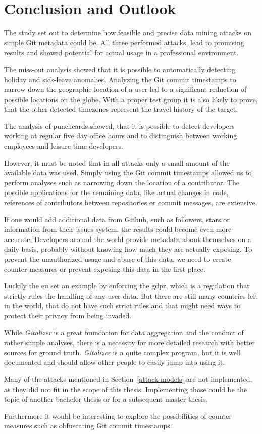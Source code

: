 \chapter{Conclusion and Outlook}

The study set out to determine how feasible and precise data mining attacks on simple Git metadata could be.
All three performed attacks, lead to promising results and showed potential for actual usage in a professional environment.

The miss-out analysis showed that it is possible to automatically detecting holiday and sick-leave anomalies.
Analyzing the Git commit timestamps to narrow down the geographic location of a user led to a significant reduction of possible locations on the globe.
With a proper test group it is also likely to prove, that the other detected timezones represent the travel history of the target.

The analysis of punchcards showed, that it is possible to detect developers working at regular five day office hours and to distinguish between working employees and leisure time developers.

However, it must be noted that in all attacks only a small amount of the available data was used.
Simply using the Git commit timestamps allowed us to perform analyses such as narrowing down the location of a contributor.
The possible applications for the remaining data, like actual changes in code, references of contributors between repositories or commit messages, are extensive.

If one would add additional data from Github, such as followers, stars or information from their issues system, the results could become even more accurate.
Developers around the world provide metadata about themselves on a daily basis, probably without knowing how much they are actually exposing.
To prevent the unauthorized usage and abuse of this data, we need to create counter-measures or prevent exposing this data in the first place.

Luckily the \ac{eu} set an example by enforcing the \ac{gdpr}, which is a regulation that strictly rules the handling of any user data.
But there are still many countries left in the world, that do not have such strict rules and that might need ways to protect their privacy from being invaded.

While \emph{Gitalizer} is a great foundation for data aggregation and the conduct of rather simple analyses, there is a necessity for more detailed research with better sources for ground truth.
\emph{Gitalizer} is a quite complex program, but it is well documented and should allow other people to easily jump into using it.

Many of the attacks mentioned in Section~\ref{attack-models} are not implemented, as they did not fit in the scope of this thesis.
Implementing those could be the topic of another bachelor thesis or for a subsequent master thesis.

Furthermore it would be interesting to explore the possibilities of counter measures such as obfuscating Git commit timestamps.
